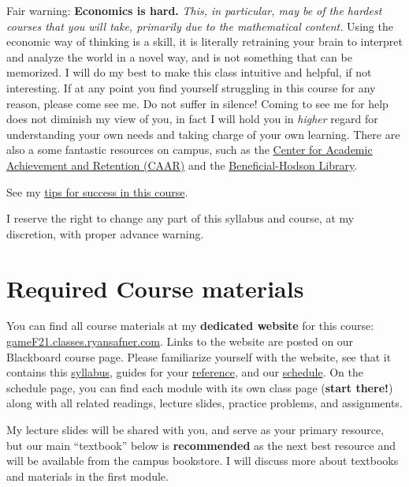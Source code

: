 \documentclass{article}
\begin{document}
{Fair warning:} \textbf{Economics is hard.} \emph{This, in particular,
may be of the hardest courses that you will take, primarily due to the
mathematical content.} Using the economic way of thinking is a skill, it
is literally retraining your brain to interpret and analyze the world in
a novel way, and is not something that can be memorized. I will do my
best to make this class intuitive and helpful, if not interesting. If at
any point you find yourself struggling in this course for any reason,
please come see me. Do not suffer in silence! Coming to see me for help
does not diminish my view of you, in fact I will hold you in
\emph{higher} regard for understanding your own needs and taking charge
of your own learning. There are also a some fantastic resources on
campus, such as the
\href{http://www.hood.edu/campus-services/academic-services/index.html}{Center
for Academic Achievement and Retention (CAAR)} and the
\href{http://www.hood.edu/library/}{Beneficial-Hodson Library}.

See my \href{/reference\#tips}{tips for success in this course}.

I reserve the right to change any part of this syllabus and course, at
my discretion, with proper advance warning.

\hypertarget{required-course-materials}{%
\section{Required Course materials}\label{required-course-materials}}

You can find all course materials at my \textbf{dedicated website} for
this course:
\href{https://gameF21.classes.ryansafner.com}{gameF21.classes.ryansafner.com}.
Links to the website are posted on our Blackboard course page. Please
familiarize yourself with the website, see that it contains this
\href{https://gameF21.classes.ryansafner.com/syllabus/}{syllabus},
guides for your
\href{https://gameF21.classes.ryansafner.com/reference/}{reference}, and
our \href{https://gameF21.classes.ryansafner.com/schedule/}{schedule}.
On the schedule page, you can find each module with its own class page
(\textbf{start there!}) along with all related readings, lecture slides,
practice problems, and assignments.

My lecture slides will be shared with you, and serve as your primary
resource, but our main ``textbook'' below is \textbf{recommended} as the
next best resource and will be available from the campus bookstore. I
will discuss more about textbooks and materials in the first module.
\end{document}

